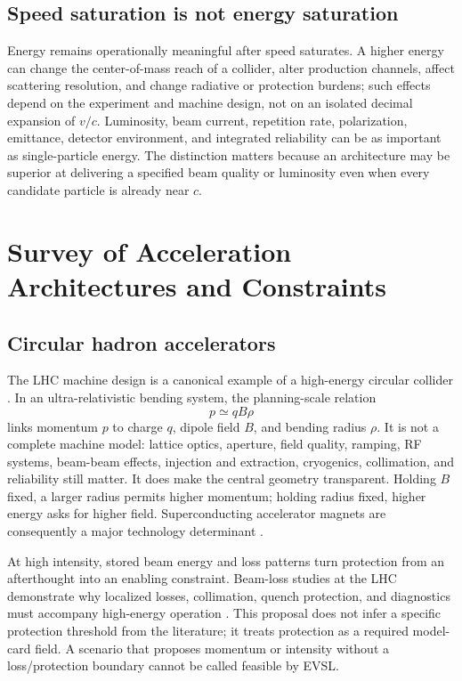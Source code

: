 \documentclass[conference]{../../../../Conference-LaTeX-template_10-17-19/IEEEtran}
\begin{document}
\subsection{Speed saturation is not energy saturation}
Energy remains operationally meaningful after speed saturates. A higher energy can change the center-of-mass reach of a collider, alter production channels, affect scattering resolution, and change radiative or protection burdens; such effects depend on the experiment and machine design, not on an isolated decimal expansion of $v/c$. Luminosity, beam current, repetition rate, polarization, emittance, detector environment, and integrated reliability can be as important as single-particle energy. The distinction matters because an architecture may be superior at delivering a specified beam quality or luminosity even when every candidate particle is already near $c$.

\section{Survey of Acceleration Architectures and Constraints}
\subsection{Circular hadron accelerators}
The LHC machine design is a canonical example of a high-energy circular collider \cite{evans_bryant2008}. In an ultra-relativistic bending system, the planning-scale relation
\begin{equation}
p\simeq qB\rho
\label{eq:rigidity}
\end{equation}
links momentum $p$ to charge $q$, dipole field $B$, and bending radius $\rho$. It is not a complete machine model: lattice optics, aperture, field quality, ramping, RF systems, beam-beam effects, injection and extraction, cryogenics, collimation, and reliability still matter. It does make the central geometry transparent. Holding $B$ fixed, a larger radius permits higher momentum; holding radius fixed, higher energy asks for higher field. Superconducting accelerator magnets are consequently a major technology determinant \cite{rossi_bottura2012}.

At high intensity, stored beam energy and loss patterns turn protection from an afterthought into an enabling constraint. Beam-loss studies at the LHC demonstrate why localized losses, collimation, quench protection, and diagnostics must accompany high-energy operation \cite{bruce2014}. This proposal does not infer a specific protection threshold from the literature; it treats protection as a required model-card field. A scenario that proposes momentum or intensity without a loss/protection boundary cannot be called feasible by EVSL.
\end{document}
